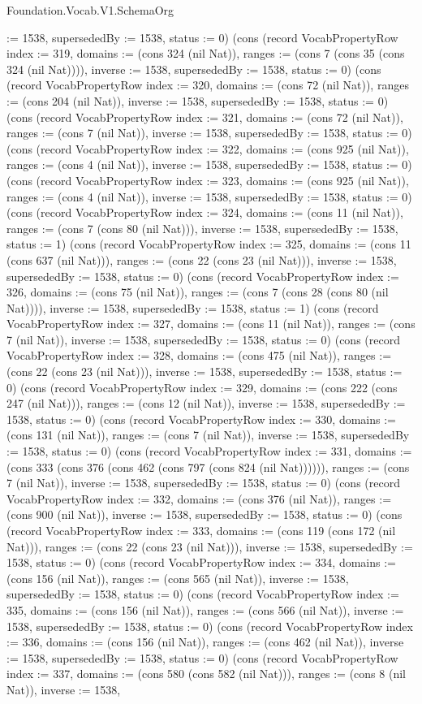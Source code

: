 \begin{lexlean}{Foundation.Vocab.V1.SchemaOrg}
\begin{semanticmodule}
{:= 1538, supersededBy := 1538, status := 0}) (cons (record VocabPropertyRow {index := 319, domains := (cons 324 (nil Nat)), ranges := (cons 7 (cons 35 (cons 324 (nil Nat)))), inverse := 1538, supersededBy := 1538, status := 0}) (cons (record VocabPropertyRow {index := 320, domains := (cons 72 (nil Nat)), ranges := (cons 204 (nil Nat)), inverse := 1538, supersededBy := 1538, status := 0}) (cons (record VocabPropertyRow {index := 321, domains := (cons 72 (nil Nat)), ranges := (cons 7 (nil Nat)), inverse := 1538, supersededBy := 1538, status := 0}) (cons (record VocabPropertyRow {index := 322, domains := (cons 925 (nil Nat)), ranges := (cons 4 (nil Nat)), inverse := 1538, supersededBy := 1538, status := 0}) (cons (record VocabPropertyRow {index := 323, domains := (cons 925 (nil Nat)), ranges := (cons 4 (nil Nat)), inverse := 1538, supersededBy := 1538, status := 0}) (cons (record VocabPropertyRow {index := 324, domains := (cons 11 (nil Nat)), ranges := (cons 7 (cons 80 (nil Nat))), inverse := 1538, supersededBy := 1538, status := 1}) (cons (record VocabPropertyRow {index := 325, domains := (cons 11 (cons 637 (nil Nat))), ranges := (cons 22 (cons 23 (nil Nat))), inverse := 1538, supersededBy := 1538, status := 0}) (cons (record VocabPropertyRow {index := 326, domains := (cons 75 (nil Nat)), ranges := (cons 7 (cons 28 (cons 80 (nil Nat)))), inverse := 1538, supersededBy := 1538, status := 1}) (cons (record VocabPropertyRow {index := 327, domains := (cons 11 (nil Nat)), ranges := (cons 7 (nil Nat)), inverse := 1538, supersededBy := 1538, status := 0}) (cons (record VocabPropertyRow {index := 328, domains := (cons 475 (nil Nat)), ranges := (cons 22 (cons 23 (nil Nat))), inverse := 1538, supersededBy := 1538, status := 0}) (cons (record VocabPropertyRow {index := 329, domains := (cons 222 (cons 247 (nil Nat))), ranges := (cons 12 (nil Nat)), inverse := 1538, supersededBy := 1538, status := 0}) (cons (record VocabPropertyRow {index := 330, domains := (cons 131 (nil Nat)), ranges := (cons 7 (nil Nat)), inverse := 1538, supersededBy := 1538, status := 0}) (cons (record VocabPropertyRow {index := 331, domains := (cons 333 (cons 376 (cons 462 (cons 797 (cons 824 (nil Nat)))))), ranges := (cons 7 (nil Nat)), inverse := 1538, supersededBy := 1538, status := 0}) (cons (record VocabPropertyRow {index := 332, domains := (cons 376 (nil Nat)), ranges := (cons 900 (nil Nat)), inverse := 1538, supersededBy := 1538, status := 0}) (cons (record VocabPropertyRow {index := 333, domains := (cons 119 (cons 172 (nil Nat))), ranges := (cons 22 (cons 23 (nil Nat))), inverse := 1538, supersededBy := 1538, status := 0}) (cons (record VocabPropertyRow {index := 334, domains := (cons 156 (nil Nat)), ranges := (cons 565 (nil Nat)), inverse := 1538, supersededBy := 1538, status := 0}) (cons (record VocabPropertyRow {index := 335, domains := (cons 156 (nil Nat)), ranges := (cons 566 (nil Nat)), inverse := 1538, supersededBy := 1538, status := 0}) (cons (record VocabPropertyRow {index := 336, domains := (cons 156 (nil Nat)), ranges := (cons 462 (nil Nat)), inverse := 1538, supersededBy := 1538, status := 0}) (cons (record VocabPropertyRow {index := 337, domains := (cons 580 (cons 582 (nil Nat))), ranges := (cons 8 (nil Nat)), inverse := 1538, }
\end{semanticmodule}
\end{lexlean}
